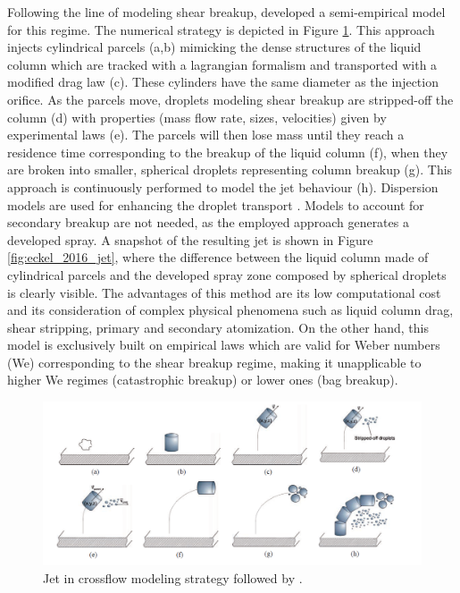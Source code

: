 Following the line of modeling shear breakup,  developed a semi-empirical model for this regime. The numerical strategy is depicted in Figure \ref{fig:eckel_2016_modeling_strategy}. This approach injects cylindrical parcels (a,b) mimicking the dense structures of the liquid column which are tracked with a lagrangian formalism and transported with a modified drag law (c). These cylinders have the same diameter as the injection orifice.  As the parcels move, droplets modeling shear breakup are stripped-off the column (d) with properties (mass flow rate, sizes, velocities) given by experimental laws (e). The parcels will then lose mass until they reach a residence time corresponding to the breakup of the liquid column (f), when they are broken into smaller, spherical droplets representing column breakup (g). This approach is continuously performed to model the jet behaviour (h). Dispersion models are used for enhancing the droplet transport . Models to account for secondary breakup are not needed, as the employed approach generates a developed spray. A snapshot of the resulting jet is shown in Figure \ref{fig:eckel_2016_jet}, where the difference between the liquid column made of cylindrical parcels and the developed spray zone composed by spherical droplets is clearly visible. The advantages of this method are its low computational cost and its consideration of complex physical phenomena such as liquid column drag, shear stripping, primary and secondary atomization. On the other hand, this model is exclusively built on empirical laws which are valid for Weber numbers (We) corresponding to the shear breakup regime, making it unapplicable to higher We regimes (catastrophic breakup) or lower ones (bag breakup).


\begin{figure}[ht]
    \centering
    \includegraphics[width=1.0\textwidth]{./part1_numerical_approaches/figures_ch3/eckel_2016_modeling_strategy}
       \centering
    \caption{Jet in crossflow modeling strategy followed by .}
    \label{fig:eckel_2016_modeling_strategy}
\end{figure}



